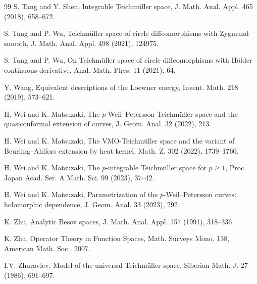 \documentclass[amstex,12pt,reqno]{amsart}
\theoremstyle{definition}
\begin{document}
\begin{thebibliography}{99}
 S. Tang and Y. Shen, Integrable Teich\-m\"ul\-ler space, 
J. Math. Anal. Appl. 465 (2018), 658--672. 

 S. Tang and P. Wu, Teich\-m\"ul\-ler space of circle diffeomorphisms with Zygmund smooth,
J. Math. Anal. Appl. 498 (2021), 124975.

 S. Tang and P. Wu, On Teich\-m\"ul\-ler space of circle diffeomorphisms with H\"older continuous derivative, 
Anal. Math. Phys. 11 (2021), 64.

 Y. Wang, Equivalent descriptions of the Loewner energy, 
Invent. Math. 218 (2019), 573--621.

 H. Wei and K. Matsuzaki, The $p$-Weil--Petersson Teich\-m\"ul\-ler space and the quasiconformal extension of curves, 
J. Geom. Anal. 32 (2022), 213.

 H. Wei and K. Matsuzaki, The VMO-Teich\-m\"ul\-ler space and the variant of Beurling--Ahlfors extension by heat kernel, 
Math. Z. 302 (2022), 1739--1760. 

 H. Wei and K. Matsuzaki, The $p$-integrable Teich\-m\"ul\-ler space for $p \geqslant 1$, 
Proc. Japan Acad. Ser. A Math. Sci. 99 (2023), 37--42. 

 H. Wei and K. Matsuzaki, Parametrization of the $p$-Weil--Petersson curves: holomorphic dependence, 
J. Geom. Anal. 33 (2023), 292.

 K. Zhu, Analytic Besov spaces,
J. Math. Anal. Appl. 157 (1991), 318--336.

 K. Zhu, Operator Theory in Function Spaces, 
Math. Surveys Mono. 138, American Math. Soc., 2007.

 I.V. Zhuravlev, Model of the universal Teich\-m\"ul\-ler space, 
Siberian Math. J. 27 (1986), 691--697.

\end{thebibliography}
\end{document}
